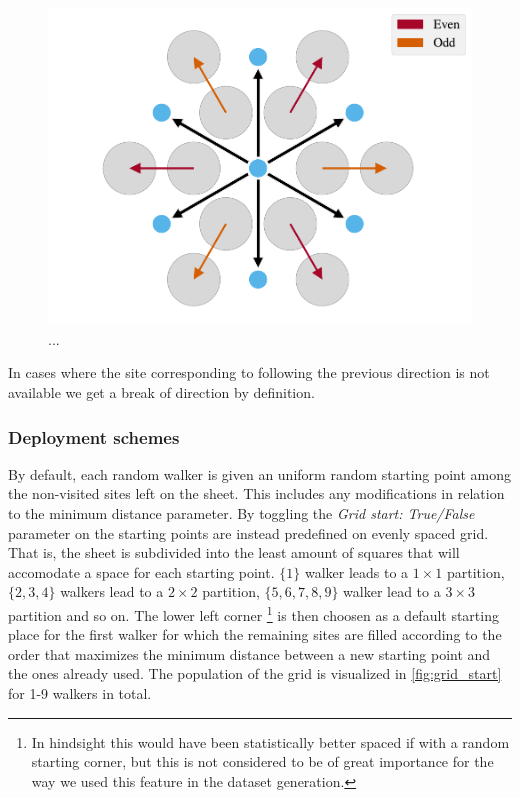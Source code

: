 \begin{figure}[H]
  \centering
  \includegraphics[width=0.5\linewidth]{figures/system/stay_or_break.pdf}
  \caption{...}
  \label{fig:stay_or_break}
\end{figure}


In cases where the site corresponding to following the previous direction is not available we get a break of direction by definition. 

\subsubsection{Deployment schemes} %
By default, each random walker is given an uniform random starting point among
the non-visited sites left on the sheet. This includes any modifications in
relation to the minimum distance parameter. By toggling the \textit{Grid start:
True/False} parameter on the starting points are instead predefined on evenly
spaced grid. That is, the sheet is subdivided into the least amount of squares
that will accomodate a space for each starting point. $\{1\}$ walker leads to a
$1\times 1$ partition, $\{2,3,4\}$ walkers lead to a $2\times 2$ partition,
$\{5,6,7,8,9\}$ walker lead to a $3\times 3$ partition and so on. The lower left
corner \footnote{In hindsight this would have been statistically better spaced
if with a random starting corner, but this is not considered to be of great
importance for the way we used this feature in the dataset generation.} is then choosen as a default starting place for the first
walker for which the remaining sites are filled according to the order that
maximizes the minimum distance between a new starting point and the ones already
used. The population of the grid is visualized in \cref{fig:grid_start} for 1-9 walkers in total. 


